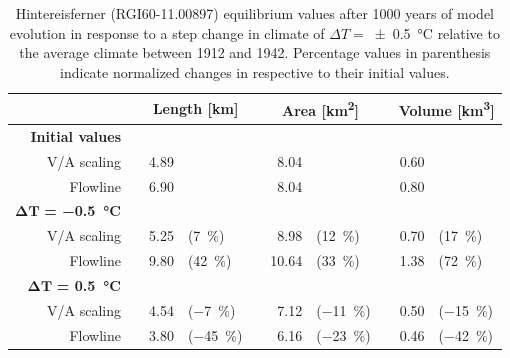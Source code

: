         \begin{table}[htp]
          \centering
          \small

          \caption{Hintereisferner (RGI60-11.00897) equilibrium values after 1000 years of model evolution in response to a step change in climate of $\Delta T = $\SI{\pm0.5}{\celsius} relative to the average climate between 1912 and 1942. Percentage values in parenthesis indicate normalized changes in respective to their initial values.}
          \label{tab:hintereisferner_equilibrium_values}
          
          \begin{tabular}{@{}rcrlcrlcrl@{}}
            \toprule
            {} & \phantom{a} & \multicolumn{2}{c}{\textbf{Length [\si{\kilo\meter}]}} & \phantom{a} & \multicolumn{2}{c}{\textbf{Area [\si{\square\kilo\meter}]}} & \phantom{a} & \multicolumn{2}{c}{\textbf{Volume [\si{\cubic\kilo\meter}]}} \\
            \midrule
            \textbf{Initial values} \\
            V/A scaling & \phantom{a} & 4.89 & & \phantom{a} & 8.04 & & \phantom{a} & 0.60 & \\
            Flowline & \phantom{a} &  6.90 & & \phantom{a} & 8.04 & & \phantom{a} & 0.80 & \\
            $\bm{\Delta T}$\textbf{ = \SI{-0.5}{\celsius}} \\
            V/A scaling & \phantom{a} & 5.25 & (\SI{+7}{\percent}) & \phantom{a} & 8.98 & (\SI{+12}{\percent}) & \phantom{a} & 0.70 & (\SI{+17}{\percent}) \\
            Flowline & \phantom{a} &  9.80 & (\SI{+42}{\percent}) & \phantom{a} & 10.64 & (\SI{+33}{\percent}) & \phantom{a} &  1.38 & (\SI{+72}{\percent}) \\
            \addlinespace
            $\bm{\Delta T}$\textbf{ = \SI{+0.5}{\celsius}} \\
            V/A scaling & \phantom{a} & 4.54 & (\SI{-7}{\percent}) & \phantom{a} & 7.12 & (\SI{-11}{\percent}) & \phantom{a} & 0.50 & (\SI{-15}{\percent}) \\
            Flowline & \phantom{a} &   3.80 & (\SI{-45}{\percent}) & \phantom{a} & 6.16 & (\SI{-23}{\percent}) & \phantom{a} & 0.46 & (\SI{-42}{\percent}) \\
            \bottomrule
          \end{tabular}
        \end{table}


